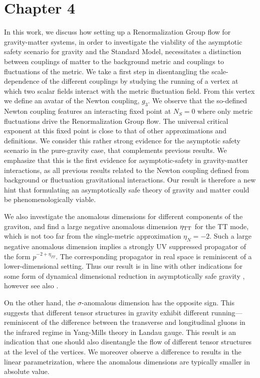 \documentclass[11pt]{book} %
\numberwithin{equation}{chapter}
\begin{document}
{\section*{Chapter 4}

In this work, we discuss how setting up a Renormalization Group flow for gravity-matter systems,
in order to investigate the viability of the asymptotic safety scenario for gravity and the Standard Model,
necessitates a distinction between couplings of matter to the background metric and couplings to
fluctuations of the metric.
We take a first step in disentangling the scale-dependence of the different couplings by studying
the running of a vertex at which two scalar fields interact with the metric fluctuation field.
From this vertex we define an avatar of the Newton coupling, $g_3$.
We observe that the so-defined Newton coupling features an interacting fixed point at $N_S=0$
where only metric fluctuations drive the Renormalization Group flow.
The universal critical exponent at this fixed point is close to that of other approximations and definitions.
We consider this rather strong evidence for the asymptotic safety scenario  in the pure-gravity case,
that complements previous results.
We emphasize that this is the first evidence for asymptotic-safety in gravity-matter interactions,
as all previous results related to the Newton coupling defined from background or fluctuation
gravitational interactions.
Our result is therefore a new hint that formulating an asymptotically safe theory of gravity
and matter could be phenomenologically viable.\newline

We also investigate the anomalous dimensions for different components of the graviton,
and find a large negative anomalous dimension $\eta_{\rm TT}$ for the TT mode,
which is not too far from the single-metric approximation $\eta_N=-2$.
Such a large negative anomalous dimension implies a strongly UV suppressed propagator of the form
$p^{-2+\eta_{TT}}$. The corresponding propagator in real space is reminiscent of a lower-dimensional setting.
Thus our result is in line with other indications for some form of dynamical dimensional reduction
in asymptotically safe gravity
\cite{Lauscher:2001ya, Lauscher:2005qz, Reuter:2011ah, Rechenberger:2012pm, Calcagni:2013vsa},
however see also \cite{DOdorico:2015jtl}.

On the other hand, the  $\sigma$-anomalous dimension has the opposite sign.
This suggests that different tensor structures in gravity exhibit different running---reminiscent
of the difference between the transverse and longitudinal gluons in the infrared regime
in Yang-Mills theory in Landau gauge.
This result is an indication that one should also disentangle the flow of different tensor structures
at the level of the vertices.
We moreover observe a difference to results in the linear parametrization,
where the anomalous dimensions are typically smaller in  absolute value.

}
\end{document}
